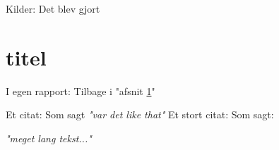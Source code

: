Kilder: Det blev gjort\cite[s. 56-78]{whatever}

\section{titel} \label{titelref}

I egen rapport: Tilbage i "afsnit \ref{titelref}"

Et citat: Som sagt \textit{"var det like that"}\cite[s. 1-2]{whatever}
Et stort citat: Som sagt:
\newline

\textit{"meget lang tekst..."}\cite[s. 5-10]{whatever}
\newline

